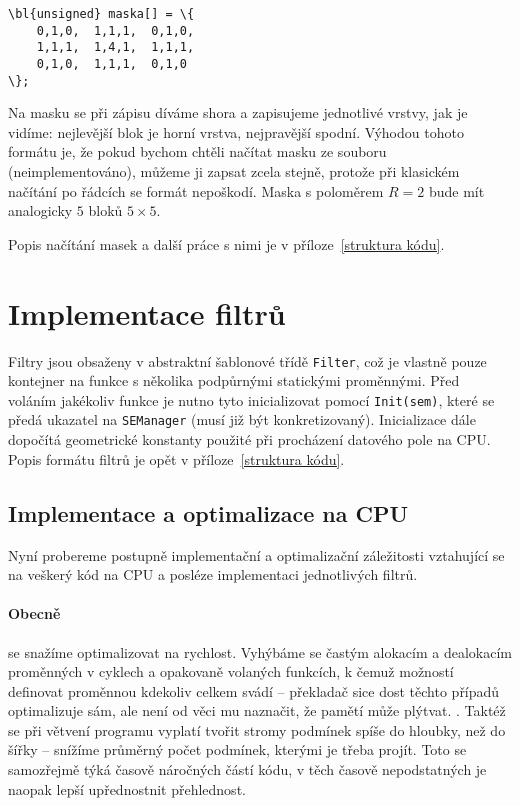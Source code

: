     \begin{Verbatim}[commandchars = \\\{\}]
\bl{unsigned} maska[] = \{
    0,1,0,  1,1,1,  0,1,0,
    1,1,1,  1,4,1,  1,1,1,
    0,1,0,  1,1,1,  0,1,0
\};
    \end{Verbatim}

    Na masku se při zápisu díváme shora a zapisujeme jednotlivé vrstvy, jak je vidíme: nejlevější blok je horní vrstva, nejpravější spodní. Výhodou tohoto formátu je, že pokud bychom chtěli načítat masku ze souboru (neimplementováno), můžeme ji zapsat zcela stejně, protože při klasickém načítání po řádcích se formát nepoškodí. Maska s poloměrem $R = 2$ bude mít analogicky $5$ bloků $5\times 5$.
    
    Popis načítání masek a další práce s nimi je v příloze~\ref{struktura kódu}.

    \section{Implementace filtrů}

    Filtry jsou obsaženy v abstraktní šablonové třídě {\tt Filter}, což je vlastně pouze kontejner na funkce s několika podpůrnými statickými proměnnými. Před voláním jakékoliv funkce je nutno tyto inicializovat pomocí {\tt Init(sem)}, které se předá ukazatel na {\tt SEManager} (musí již být konkretizovaný). Inicializace dále dopočítá geometrické konstanty použité při procházení datového pole na CPU. Popis formátu filtrů je opět v příloze~\ref{struktura kódu}.

    \subsection{Implementace a optimalizace na CPU}

        Nyní probereme postupně implementační a optimalizační záležitosti vztahující se na veškerý kód na CPU a posléze implementaci jednotlivých filtrů.

        \paragraph{Obecně} se snažíme optimalizovat na rychlost. Vyhýbáme se častým alokacím a dealokacím proměnných v cyklech a opakovaně volaných funkcích, k čemuž \Cpp možností definovat proměnnou kdekoliv celkem svádí -- překladač sice dost těchto případů optimalizuje sám, ale není od věci mu naznačit, že pamětí může plýtvat. . Taktéž se při větvení programu vyplatí tvořit stromy podmínek spíše do hloubky, než do šířky -- snížíme průměrný počet podmínek, kterými je třeba projít. Toto se samozřejmě týká časově náročných částí kódu, v těch časově nepodstatných je naopak lepší upřednostnit přehlednost. 

